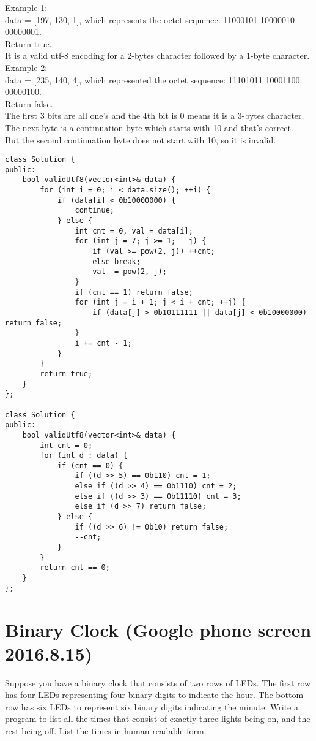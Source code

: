 Example 1:\\
data = [197, 130, 1], which represents the octet sequence: 11000101 10000010 00000001.\\
Return true.\\
It is a valid utf-8 encoding for a 2-bytes character followed by a 1-byte character.\\

Example 2:\\
data = [235, 140, 4], which represented the octet sequence: 11101011 10001100 00000100.\\
Return false.\\
The first 3 bits are all one's and the 4th bit is 0 means it is a 3-bytes character.\\
The next byte is a continuation byte which starts with 10 and that's correct.\\
But the second continuation byte does not start with 10, so it is invalid.\\

\begin{lstlisting}
class Solution {
public:
    bool validUtf8(vector<int>& data) {
        for (int i = 0; i < data.size(); ++i) {
            if (data[i] < 0b10000000) {
                continue;
            } else {
                int cnt = 0, val = data[i];
                for (int j = 7; j >= 1; --j) {
                    if (val >= pow(2, j)) ++cnt;
                    else break;
                    val -= pow(2, j);
                }
                if (cnt == 1) return false;
                for (int j = i + 1; j < i + cnt; ++j) {
                    if (data[j] > 0b10111111 || data[j] < 0b10000000) return false;
                } 
                i += cnt - 1;
            }
        }
        return true;
    }
};

class Solution {
public:
    bool validUtf8(vector<int>& data) {
        int cnt = 0;
        for (int d : data) {
            if (cnt == 0) {
                if ((d >> 5) == 0b110) cnt = 1;
                else if ((d >> 4) == 0b1110) cnt = 2;
                else if ((d >> 3) == 0b11110) cnt = 3;
                else if (d >> 7) return false;
            } else {
                if ((d >> 6) != 0b10) return false;
                --cnt;
            }
        }
        return cnt == 0;
    }
};
\end{lstlisting}


\section{Binary Clock (Google phone screen 2016.8.15)}
Suppose you have a binary clock that consists of two rows of LEDs. The first row has four LEDs representing four binary digits to indicate the hour. The bottom row has six LEDs to represent six binary digits indicating the minute. Write a program to list all the times that consist of exactly three lights being on, and the rest being off. List the times in human readable form.\\

